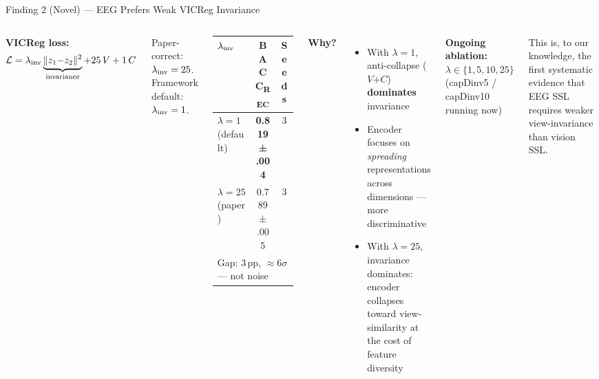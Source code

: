 \documentclass[aspectratio=169,10pt]{beamer}
\begin{document}
\begin{frame}{Finding 2 (Novel) — EEG Prefers Weak VICReg Invariance}
\begin{columns}[T]
\textbf{VICReg loss:}
$$\mathcal{L} = \lambda_{\rm inv}\underbrace{\|z_1{-}z_2\|^2}_{\rm invariance}
             + 25\,V + 1\,C$$

Paper-correct: $\lambda_{\rm inv} = 25$. \quad Framework default: $\lambda_{\rm inv} = 1$.

\vspace{0.7em}
\begin{tabular}{lcc}
\toprule
$\lambda_{\rm inv}$ & BACC\textsubscript{REC} & Seeds \\
\midrule
$\lambda = 1$ (default) & \textbf{0.819 ± .004} & 3 \\
$\lambda = 25$ (paper) & 0.789 ± .005 & 3 \\
\bottomrule
\multicolumn{3}{l}{\footnotesize Gap: 3\,pp, ${\approx}6\sigma$ — not noise}
\end{tabular}

\textbf{Why?}
\begin{itemize}
  \item With $\lambda{=}1$, anti-collapse ($V$+$C$) \textbf{dominates} invariance
  \item Encoder focuses on \emph{spreading} representations across dimensions — more discriminative
  \item With $\lambda{=}25$, invariance dominates: encoder collapses toward view-similarity at the cost of feature diversity
\end{itemize}

\vspace{0.5em}
\textbf{Ongoing ablation:} $\lambda \in \{1, 5, 10, 25\}$\\
(capDinv5 / capDinv10 running now)

\vspace{0.5em}
\textcolor{accent}{This is, to our knowledge, the first systematic evidence that EEG SSL requires weaker view-invariance than vision SSL.}
\end{columns}
\end{frame}
\end{document}
